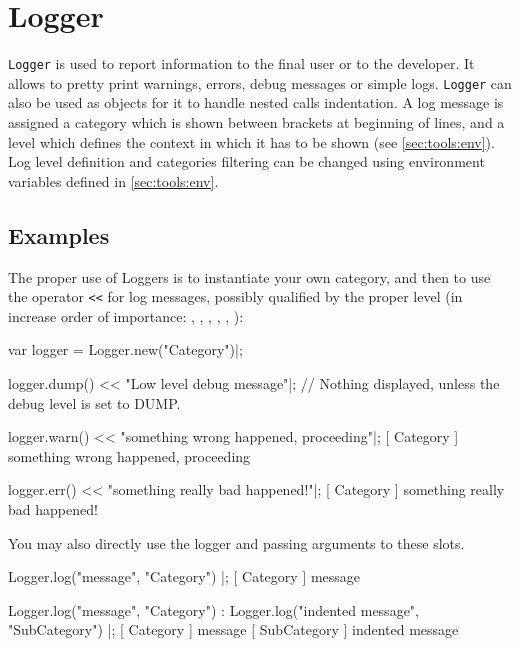 
\section{Logger}

\lstinline|Logger| is used to report information to the final user or to the
developer. It allows to pretty print warnings, errors, debug messages or
simple logs. \lstinline|Logger| can also be used as  objects
for it to handle nested calls indentation. A log message is assigned a
category which is shown between brackets at beginning of lines, and a level
which defines the context in which it has to be shown (see
\autoref{sec:tools:env}). Log level definition and categories filtering can
be changed using environment variables defined in \autoref{sec:tools:env}.

\subsection{Examples}

The proper use of Loggers is to instantiate your own category, and then to
use the operator \lstinline|<<| for log messages, possibly qualified by the
proper level (in increase order of importance: ,
, , , ,
):

\begin{urbiunchecked}
var logger = Logger.new("Category")|;

logger.dump() << "Low level debug message"|;
// Nothing displayed, unless the debug level is set to DUMP.

logger.warn() << "something wrong happened, proceeding"|;
[       Category        ] something wrong happened, proceeding

logger.err() << "something really bad happened!"|;
[       Category        ] something really bad happened!
\end{urbiunchecked}

You may also directly use the logger and passing arguments to these slots.

\begin{urbiunchecked}
Logger.log("message", "Category") |;
[       Category        ] message

Logger.log("message", "Category") :
{
  Logger.log("indented message", "SubCategory")
}|;
[       Category        ] message
[      SubCategory      ]   indented message
\end{urbiunchecked}

